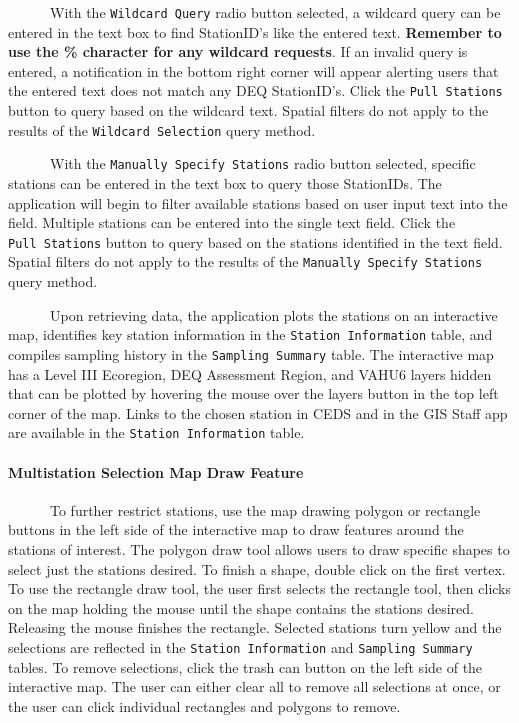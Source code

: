 \documentclass[
]{article}
\begin{document}
~~~~~~With the \texttt{Wildcard\ Query} radio button selected, a
wildcard query can be entered in the text box to find StationID's like
the entered text. \textbf{Remember to use the \% character for any
wildcard requests}. If an invalid query is entered, a notification in
the bottom right corner will appear alerting users that the entered text
does not match any DEQ StationID's. Click the \texttt{Pull\ Stations}
button to query based on the wildcard text. Spatial filters do not apply
to the results of the \texttt{Wildcard\ Selection} query method.

~~~~~~With the \texttt{Manually\ Specify\ Stations} radio button
selected, specific stations can be entered in the text box to query
those StationIDs. The application will begin to filter available
stations based on user input text into the field. Multiple stations can
be entered into the single text field. Click the \texttt{Pull\ Stations}
button to query based on the stations identified in the text field.
Spatial filters do not apply to the results of the
\texttt{Manually\ Specify\ Stations} query method.

~~~~~~Upon retrieving data, the application plots the stations on an
interactive map, identifies key station information in the
\texttt{Station\ Information} table, and compiles sampling history in
the \texttt{Sampling\ Summary} table. The interactive map has a Level
III Ecoregion, DEQ Assessment Region, and VAHU6 layers hidden that can
be plotted by hovering the mouse over the layers button in the top left
corner of the map. Links to the chosen station in CEDS and in the GIS
Staff app are available in the \texttt{Station\ Information} table.

\hypertarget{multistation-selection-map-draw-feature}{%
\paragraph{Multistation Selection Map Draw
Feature}\label{multistation-selection-map-draw-feature}}

~~~~~~To further restrict stations, use the map drawing polygon or
rectangle buttons in the left side of the interactive map to draw
features around the stations of interest. The polygon draw tool allows
users to draw specific shapes to select just the stations desired. To
finish a shape, double click on the first vertex. To use the rectangle
draw tool, the user first selects the rectangle tool, then clicks on the
map holding the mouse until the shape contains the stations desired.
Releasing the mouse finishes the rectangle. Selected stations turn
yellow and the selections are reflected in the
\texttt{Station\ Information} and \texttt{Sampling\ Summary} tables. To
remove selections, click the trash can button on the left side of the
interactive map. The user can either clear all to remove all selections
at once, or the user can click individual rectangles and polygons to
remove.
\end{document}
